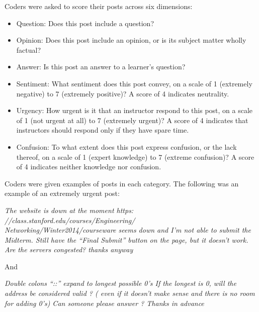 \documentclass{edm_template}
\newcommand{\squishlist}{
 \begin{list}{$\bullet$}
 {
  \setlength{\itemsep}{0pt}
  \setlength{\parsep}{3pt}
  \setlength{\topsep}{3pt}
  \setlength{\partopsep}{0pt}
  \setlength{\leftmargin}{1.5em}
  \setlength{\labelwidth}{1em}
  \setlength{\labelsep}{0.5em} } }
\newcommand{\squishend}{
  \end{list}  }
\begin{document}
Coders were asked to score their posts across six dimensions:
\begin{itemize}
\vspace{-10pt}
       \setlength\itemsep{0.05em}
       \item Question: Does this post include a question?
       \item Opinion: Does this post include an opinion, or is its subject matter wholly factual?
       \item Answer: Is this post an answer to a learner's question?
       \item Sentiment: What sentiment does this post convey, on a scale of 1 (extremely negative) to 7 (extremely positive)? A score of 4 indicates neutrality.
       \item Urgency: How urgent is it that an instructor respond to this post, on a scale of 1 (not urgent at all) to 7 (extremely urgent)? A score of 4 indicates that instructors should respond only if they have spare time.
       \item Confusion: To what extent does this post express confusion, or the lack thereof, on a scale of 1 (expert knowledge) to 7 (extreme confusion)? A score of 4 indicates neither knowledge nor confusion.
\end{itemize}
\vspace{-10pt}
Coders were given examples of posts in each category. The following was an example of an extremely urgent post:

\vspace{-10pt}
\begin{displayquote}
\emph{The website is down at the moment
       https:\\//class.stanford.edu/courses/Engineering/\\Networking/Winter2014/courseware
       seems down and I'm not able to submit the Midterm. Still have
       the ``Final Submit'' button on the page, but it doesn't work. Are
       the servers congested? 
       thanks anyway}
\end{displayquote}
\vspace{-10pt}

And

\vspace{-10pt}
\begin{displayquote}
\emph{Double colons ``::''  expand to longest possible 0's  
       If the longest is 0, will  the address be considered valid ?  (
       even if it doesn't make sense and there is no room for adding
       0's) 
       Can someone please answer ?
       Thanks in advance}
\end{displayquote}
\vspace{-10pt}
\end{document}
